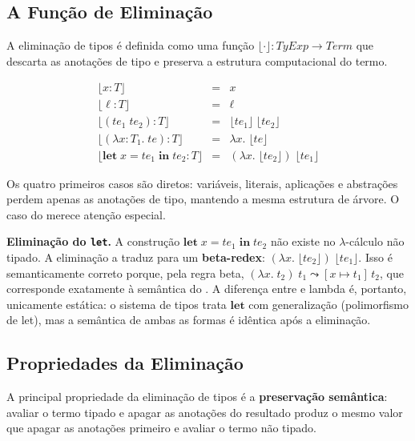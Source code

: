   \subsection{A Função de Eliminação}

  A eliminação de tipos é definida como uma função \(\lfloor \cdot \rfloor :
  \mathit{TyExp} \to \mathit{Term}\) que descarta as anotações de tipo e
  preserva a estrutura computacional do termo.

  \[
    \begin{array}{rcl}
      \lfloor x : T \rfloor & = & x \\[4pt]
      \lfloor \ell : T \rfloor & = & \ell \\[4pt]
      \lfloor (te_1\; te_2) : T \rfloor & = & \lfloor te_1 \rfloor\;
        \lfloor te_2 \rfloor \\[4pt]
      \lfloor (\lambda x {:} T_1.\; te) : T \rfloor & = & \lambda x.\;
        \lfloor te \rfloor \\[4pt]
      \lfloor \mathbf{let}\; x = te_1\; \mathbf{in}\; te_2 : T \rfloor & = &
        (\lambda x.\; \lfloor te_2 \rfloor)\; \lfloor te_1 \rfloor
    \end{array}
  \]

  Os quatro primeiros casos são diretos: variáveis, literais, aplicações e
  abstrações perdem apenas as anotações de tipo, mantendo a mesma estrutura
  de árvore. O caso do  merece atenção especial.

  \textbf{Eliminação do \texttt{let}.} A construção \(\mathbf{let}\; x =
  te_1\; \mathbf{in}\; te_2\) não existe no $\lambda$-cálculo não tipado. A
  eliminação a traduz para um \textbf{beta-redex}: \((\lambda x.\; \lfloor
  te_2 \rfloor)\; \lfloor te_1 \rfloor\). Isso é semanticamente correto
  porque, pela regra beta, \((\lambda x.\; t_2)\; t_1 \leadsto
  [x \mapsto t_1]\, t_2\), que corresponde exatamente à semântica do
  . A diferença entre  e lambda é, portanto,
  unicamente estática: o sistema de tipos trata \(\mathbf{let}\) com
  generalização (polimorfismo de let), mas a semântica de ambas as formas é
  idêntica após a eliminação.

  \subsection{Propriedades da Eliminação}

  A principal propriedade da eliminação de tipos é a
  \textbf{preservação semântica}: avaliar o termo tipado e apagar as
  anotações do resultado produz o mesmo valor que apagar as anotações
  primeiro e avaliar o termo não tipado.

